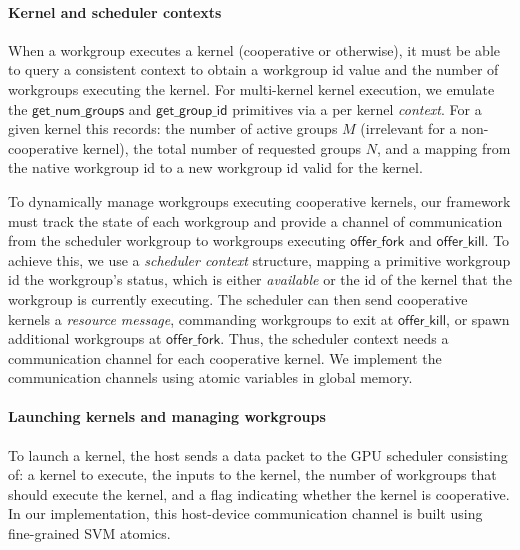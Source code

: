 \documentclass[numbers,nocopyrightspace,10pt]{sigplanconf}
\newcommand{\offerfork}{\mathsf{offer\_fork}}
\newcommand{\offerkill}{\mathsf{offer\_kill}}
\newcommand{\getgroupid}{\mathsf{get\_group\_id}}
\newcommand{\getnumgroups}{\mathsf{get\_num\_groups}}
\begin{document}
\paragraph{Kernel and scheduler contexts}

When a workgroup executes a kernel (cooperative or otherwise), it must
be able to query a consistent context to obtain a workgroup id value
and the
number of workgroups executing the kernel. For multi-kernel
kernel execution, we emulate the $\getnumgroups$ and $\getgroupid$ 
primitives via a per kernel \emph{context}.  For a given kernel this records: the number of active groups $M$ (irrelevant for a non-cooperative kernel), the total number of requested groups $N$, and a mapping from the native workgroup id to a new workgroup
id valid for the kernel.

To dynamically manage workgroups executing cooperative
kernels, our framework must track the state of each workgroup and
provide a channel of communication from the scheduler workgroup to
workgroups executing $\offerfork$ and $\offerkill$. To achieve this,
we use a \emph{scheduler context} structure, mapping a primitive workgroup id the workgroup's status, which is either \emph{available} or the id of the kernel that the workgroup is currently executing.  The scheduler can then send cooperative
kernels a \emph{resource message}, commanding workgroups to exit at $\offerkill$, or 
spawn additional workgroups at $\offerfork$. Thus, the
scheduler context needs a communication channel for each cooperative
kernel. We implement the communication channels using atomic variables in global memory.

\paragraph{Launching kernels and managing workgroups}

To launch a kernel, the host sends a data packet to the GPU
scheduler consisting of: a kernel to execute, the inputs to the kernel, the
number of workgroups that should execute the kernel, and a flag indicating whether the kernel
is cooperative. In our implementation, this host-device communication channel is built using fine-grained SVM atomics.
\end{document}
